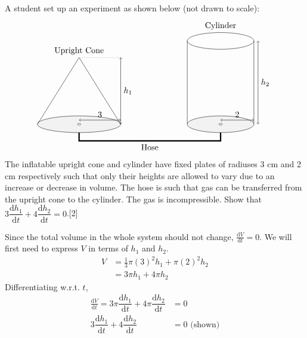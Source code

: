 \documentclass[12pt, a4 paper]{article}
\begin{document}
\begin{outline}[enumerate]
 \1 A student set up an experiment as shown below (not drawn to scale):
 \[
  \begin{tikzpicture}
   \filldraw[color=white!90!gray,draw=black] (0,0) ellipse (50pt and 10pt);
   \draw[<->](0,5pt) -- (25pt,5pt) node[above]{3} --   (50pt,5pt);
   \draw[<->](50pt,0pt) -- (50pt,40pt) node[right]{\(h_{1}\)} --   (50pt,80pt);
   \draw[dotted](50pt,80pt) -- (0,80pt);
   \draw (-50pt,0) -- (0,80pt) node[above]{Upright Cone} -- (50pt,0);
   \draw (130pt,0) -- (130pt,100pt);
   \draw (210pt,0) -- (210pt,100pt);
   \filldraw[color=white!90!gray,draw=black] (170pt,0) ellipse (40pt and 10pt);
   \draw[<->](170pt,5pt) -- (190pt,5pt) node[above]{2} --   (210pt,5pt);
   \draw[<->](215pt,0pt) -- (215pt,50pt) node[right]{\(h_{2}\)} --   (215pt,100pt);
   \draw (170pt, 110pt) node[above] {Cylinder};
   \draw (170pt,100pt) ellipse (40pt and 10pt);
   \draw[ultra thick] (0,-10pt) -- (0,-20pt) -- (85pt,-20pt) node[below]{Hose} -- (170pt,-20pt) -- (170pt, -10pt);
   \filldraw[color=white,draw=black] (0,0) ellipse (2pt and 1pt);
   \filldraw[color=white,draw=black] (170pt,0) ellipse (2pt and 1pt);
  \end{tikzpicture}
 \]
 The inflatable upright cone and cylinder have fixed plates of radiuses 3 cm and 2 cm  respectively such that only their heights are allowed to vary due to an increase or decrease in volume. The hose is such that gas can be transferred from the upright cone to the cylinder. The gas is incompressible. %
 \2 Show that \(3\dfrac{\mathrm{d}h_{1}}{\mathrm{d}t}+4\dfrac{\mathrm{d}h_{2}}{\mathrm{d}t}=0\).\hfill[2]
 \begin{answer}
  Since the total volume in the whole system should not change, \(\frac{\mathrm{d}V}{\mathrm{d}t}=0\). We will first need to express \(V\) in terms of \(h_{1}\) and \(h_{2}\).
  \begin{align*}
    V &= \frac{1}{3}\pi (3)^2 h_{1} + \pi (2)^2 h_{2}\\
    &= 3 \pi h_{1} + 4 \pi h_{2}
  \end{align*}
  Differentiating w.r.t. \(t\),
  \begin{align*}
    \frac{\mathrm{d}V}{\mathrm{d}t} = 3 \pi \dfrac{\mathrm{d}h_{1}}{\mathrm{d}t} + 4 \pi \dfrac{\mathrm{d}h_{2}}{\mathrm{d}t} &= 0\\
    3\dfrac{\mathrm{d}h_{1}}{\mathrm{d}t}+4\dfrac{\mathrm{d}h_{2}}{\mathrm{d}t}&=0 \textrm{ (shown)}
  \end{align*}
 \end{answer}


\end{outline}
\end{document}
